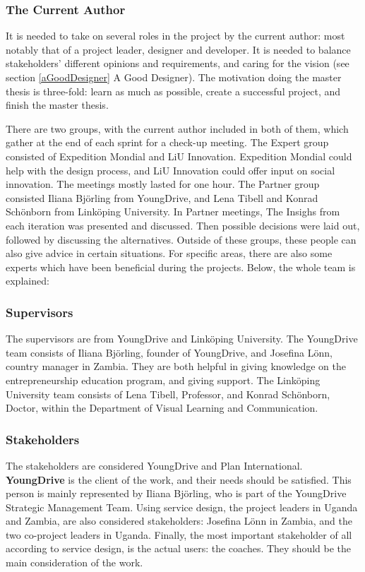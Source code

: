 \subsubsection{The Current Author}
It is needed to take on several roles in the project by the current author: most notably that of a project leader, designer and developer. It is needed to balance stakeholders' different opinions and requirements, and caring for the vision (see section \ref{aGoodDesigner} A Good Designer). The motivation doing the master thesis is three-fold: learn as much as possible, create a successful project, and finish the master thesis.

There are two groups, with the current author included in both of them, which gather at the end of each sprint for a check-up meeting. The Expert group consisted of Expedition Mondial and LiU Innovation. Expedition Mondial could help with the design process, and LiU Innovation could offer input on social innovation. The meetings mostly lasted for one hour. The Partner group consisted Iliana Björling from YoungDrive, and Lena Tibell and Konrad Schönborn from Linköping University. In Partner meetings, The Insighs from each iteration was presented and discussed. Then possible decisions were laid out, followed by discussing the alternatives. Outside of these groups, these people can also give advice in certain situations. For specific areas, there are also some experts which have been beneficial during the projects. Below, the whole team is explained: %

\subsubsection{Supervisors}
The supervisors are from YoungDrive and Linköping University. The YoungDrive team consists of Iliana Björling, founder of YoungDrive, and Josefina Lönn, country manager in Zambia. They are both helpful in giving knowledge on the entrepreneurship education program, and giving support. The Linköping University team consists of Lena Tibell, Professor, and Konrad Schönborn, Doctor, within the Department of Visual Learning and Communication.

\subsubsection{Stakeholders}
The stakeholders are considered YoungDrive and Plan International. \textbf{YoungDrive} is the client of the work, and their needs should be satisfied. This person is mainly represented by Iliana Björling, who is part of the YoungDrive Strategic Management Team. Using service design, the project leaders in Uganda and Zambia, are also considered stakeholders: Josefina Lönn in Zambia, and the two co-project leaders in Uganda. Finally, the most important stakeholder of all according to service design, is the actual users: the coaches. They should be the main consideration of the work.

